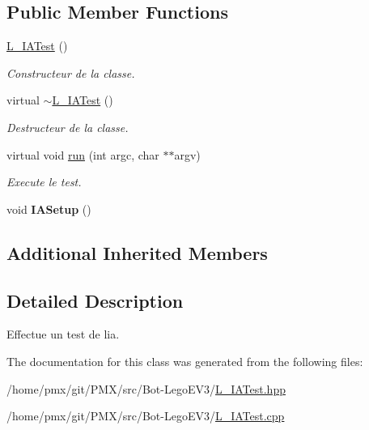 \subsection*{Public Member Functions}
\begin{DoxyCompactItemize}
\item 
\mbox{\label{classL__IATest_adf515c31d589296b2d1bb8f4112bb17e}} 
\hyperlink{classL__IATest_adf515c31d589296b2d1bb8f4112bb17e}{L\+\_\+\+I\+A\+Test} ()
\begin{DoxyCompactList}\small\item\em Constructeur de la classe. \end{DoxyCompactList}\item 
\mbox{\label{classL__IATest_a553dc0950374599cb8b4101d17e820e1}} 
virtual \hyperlink{classL__IATest_a553dc0950374599cb8b4101d17e820e1}{$\sim$\+L\+\_\+\+I\+A\+Test} ()
\begin{DoxyCompactList}\small\item\em Destructeur de la classe. \end{DoxyCompactList}\item 
\mbox{\label{classL__IATest_adae506ab06c58655167898d93903d767}} 
virtual void \hyperlink{classL__IATest_adae506ab06c58655167898d93903d767}{run} (int argc, char $\ast$$\ast$argv)
\begin{DoxyCompactList}\small\item\em Execute le test. \end{DoxyCompactList}\item 
\mbox{\label{classL__IATest_adf4c4e2384553f743809052010bca9b8}} 
void {\bfseries I\+A\+Setup} ()
\end{DoxyCompactItemize}
\subsection*{Additional Inherited Members}


\subsection{Detailed Description}
Effectue un test de l\textquotesingle{}ia. 

The documentation for this class was generated from the following files\+:\begin{DoxyCompactItemize}
\item 
/home/pmx/git/\+P\+M\+X/src/\+Bot-\/\+Lego\+E\+V3/\hyperlink{L__IATest_8hpp}{L\+\_\+\+I\+A\+Test.\+hpp}\item 
/home/pmx/git/\+P\+M\+X/src/\+Bot-\/\+Lego\+E\+V3/\hyperlink{L__IATest_8cpp}{L\+\_\+\+I\+A\+Test.\+cpp}\end{DoxyCompactItemize}
